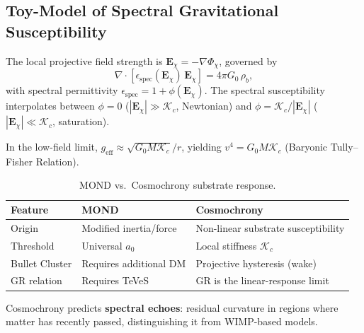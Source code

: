 \subsection{Toy-Model of Spectral Gravitational Susceptibility}
  \label{app:spectral-gravitational-toy-model}

  The local projective field strength is
  $\mathbf{E}_\chi = -\nabla\Phi_\chi$, governed by
  \[
    \nabla \cdot \left[
                   \epsilon_{\text{spec}}(\mathbf{E}_\chi)\,
                   \mathbf{E}_\chi
    \right]
    = 4\pi G_0\,\rho_b,
  \]
  with spectral permittivity
  $\epsilon_{\text{spec}} = 1 + \phi(\mathbf{E}_\chi)$.
  The spectral susceptibility interpolates between
  $\phi = 0$ ($|\mathbf{E}_\chi| \gg \mathcal{K}_c$, Newtonian) and
  $\phi = \mathcal{K}_c/|\mathbf{E}_\chi|$
  ($|\mathbf{E}_\chi| \ll \mathcal{K}_c$, saturation).

  In the low-field limit,
  $g_{\mathrm{eff}} \approx \sqrt{G_0 M \mathcal{K}_c}/r$, yielding
  $v^4 = G_0 M \mathcal{K}_c$ (Baryonic Tully--Fisher Relation).

  \begin{table}[h]
    \centering
    \begin{tabular}{|l|l|l|}
      \hline
      \textbf{Feature} &
      \textbf{MOND} &
      \textbf{Cosmochrony} \\
      \hline
      Origin &
      Modified inertia/force &
      Non-linear substrate susceptibility \\
      \hline
      Threshold &
      Universal $a_0$ &
      Local stiffness $\mathcal{K}_c$ \\
      \hline
      Bullet Cluster &
      Requires additional DM &
      Projective hysteresis (wake) \\
      \hline
      GR relation &
      Requires TeVeS &
      GR is the linear-response limit \\
      \hline
    \end{tabular}
    \caption{MOND vs.\ Cosmochrony substrate response.}
  \end{table}

  Cosmochrony predicts \textbf{spectral echoes}: residual curvature in
  regions where matter has recently passed, distinguishing it from
  WIMP-based models.
